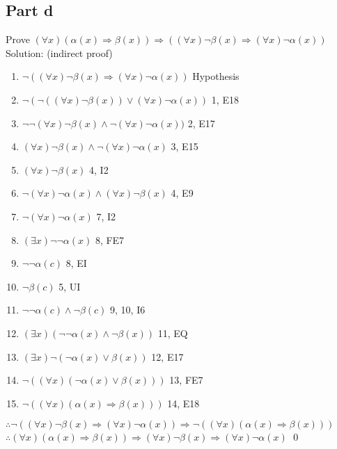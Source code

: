 \documentclass{article}
\begin{document}
		\subsection{Part d}
			Prove $(\forall x)(\alpha(x) \Rightarrow \beta(x)) \Rightarrow ((\forall x)\lnot\beta(x) \Rightarrow (\forall x)\lnot\alpha(x))$ \\
			Solution: (indirect proof) \\
			\begin{enumerate}
				\item $\lnot((\forall x)\lnot\beta(x) \Rightarrow (\forall x)\lnot\alpha(x))$ \hfill Hypothesis
				\item $\lnot(\lnot((\forall x)\lnot\beta(x)) \lor (\forall x)\lnot\alpha(x))$ \hfill 1, E18
				\item $\lnot\lnot(\forall x)\lnot\beta(x) \land \lnot(\forall x)\lnot\alpha(x))$ \hfill 2, E17
				\item $(\forall x)\lnot\beta(x) \land \lnot(\forall x)\lnot\alpha(x)$ \hfill 3, E15
				\item $(\forall x)\lnot\beta(x)$ \hfill 4, I2
				\item $\lnot(\forall x)\lnot\alpha(x) \land (\forall x)\lnot\beta(x)$ \hfill 4, E9
				\item $\lnot(\forall x)\lnot\alpha(x)$ \hfill 7, I2
				\item $(\exists x)\lnot\lnot\alpha(x)$ \hfill 8, FE7
				\item $\lnot\lnot\alpha(c)$ \hfill 8, EI
				\item $\lnot\beta(c)$ \hfill 5, UI 
				\item $\lnot\lnot\alpha(c) \land \lnot\beta(c)$ \hfill 9, 10, I6
				\item $(\exists x)(\lnot\lnot\alpha(x) \land \lnot\beta(x))$ \hfill 11, EQ
				\item $(\exists x)\lnot(\lnot\alpha(x) \lor \beta(x))$ \hfill 12, E17
				\item $\lnot((\forall x)(\lnot\alpha(x) \lor \beta(x)))$ \hfill 13, FE7
				\item $\lnot((\forall x)(\alpha(x) \Rightarrow \beta(x)))$ \hfill 14, E18
			\end{enumerate}
			$\therefore \lnot((\forall x)\lnot\beta(x) \Rightarrow (\forall x)\lnot\alpha(x)) \Rightarrow \lnot((\forall x)(\alpha(x) \Rightarrow \beta(x)))$ \\
			$\therefore (\forall x)(\alpha(x) \Rightarrow \beta(x)) \Rightarrow (\forall x)\lnot\beta(x) \Rightarrow (\forall x)\lnot\alpha(x)$ \hfill \qed \\
\end{document}
